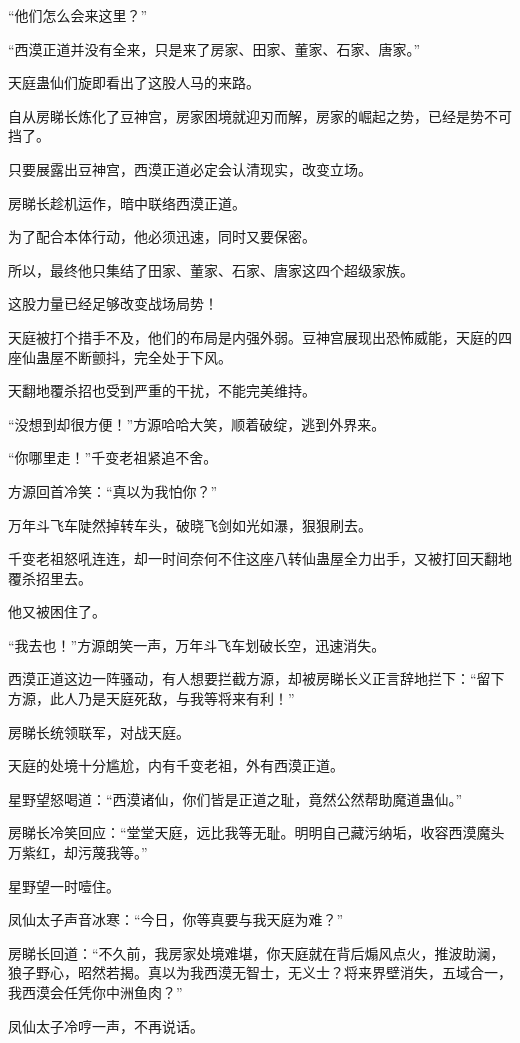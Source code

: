 \begin{this_body}
“他们怎么会来这里？”

“西漠正道并没有全来，只是来了房家、田家、董家、石家、唐家。”

天庭蛊仙们旋即看出了这股人马的来路。

自从房睇长炼化了豆神宫，房家困境就迎刃而解，房家的崛起之势，已经是势不可挡了。

只要展露出豆神宫，西漠正道必定会认清现实，改变立场。

房睇长趁机运作，暗中联络西漠正道。

为了配合本体行动，他必须迅速，同时又要保密。

所以，最终他只集结了田家、董家、石家、唐家这四个超级家族。

这股力量已经足够改变战场局势！

天庭被打个措手不及，他们的布局是内强外弱。豆神宫展现出恐怖威能，天庭的四座仙蛊屋不断颤抖，完全处于下风。

天翻地覆杀招也受到严重的干扰，不能完美维持。

“没想到却很方便！”方源哈哈大笑，顺着破绽，逃到外界来。

“你哪里走！”千变老祖紧追不舍。

方源回首冷笑：“真以为我怕你？”

万年斗飞车陡然掉转车头，破晓飞剑如光如瀑，狠狠刷去。

千变老祖怒吼连连，却一时间奈何不住这座八转仙蛊屋全力出手，又被打回天翻地覆杀招里去。

他又被困住了。

“我去也！”方源朗笑一声，万年斗飞车划破长空，迅速消失。

西漠正道这边一阵骚动，有人想要拦截方源，却被房睇长义正言辞地拦下：“留下方源，此人乃是天庭死敌，与我等将来有利！”

房睇长统领联军，对战天庭。

天庭的处境十分尴尬，内有千变老祖，外有西漠正道。

星野望怒喝道：“西漠诸仙，你们皆是正道之耻，竟然公然帮助魔道蛊仙。”

房睇长冷笑回应：“堂堂天庭，远比我等无耻。明明自己藏污纳垢，收容西漠魔头万紫红，却污蔑我等。”

星野望一时噎住。

凤仙太子声音冰寒：“今日，你等真要与我天庭为难？”

房睇长回道：“不久前，我房家处境难堪，你天庭就在背后煽风点火，推波助澜，狼子野心，昭然若揭。真以为我西漠无智士，无义士？将来界壁消失，五域合一，我西漠会任凭你中洲鱼肉？”

凤仙太子冷哼一声，不再说话。


\end{this_body}

